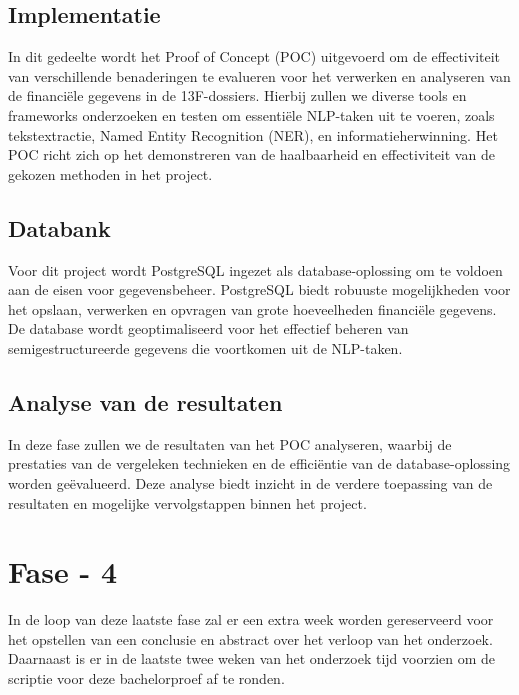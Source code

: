 \subsection{Implementatie}
In dit gedeelte wordt het Proof of Concept (POC) uitgevoerd om de effectiviteit van verschillende benaderingen te evalueren voor het verwerken en analyseren van de financiële gegevens in de 13F-dossiers. Hierbij zullen we diverse tools en frameworks onderzoeken en testen om essentiële NLP-taken uit te voeren, zoals tekstextractie, Named Entity Recognition (NER), en informatieherwinning. Het POC richt zich op het demonstreren van de haalbaarheid en effectiviteit van de gekozen methoden in het project.

\subsection{Databank}
Voor dit project wordt PostgreSQL ingezet als database-oplossing om te voldoen aan de eisen voor gegevensbeheer. PostgreSQL biedt robuuste mogelijkheden voor het opslaan, verwerken en opvragen van grote hoeveelheden financiële gegevens. De database wordt geoptimaliseerd voor het effectief beheren van semigestructureerde gegevens die voortkomen uit de NLP-taken.


\subsection{Analyse van de resultaten}
In deze fase zullen we de resultaten van het POC analyseren, waarbij de prestaties van de vergeleken technieken en de efficiëntie van de database-oplossing worden geëvalueerd. Deze analyse biedt inzicht in de verdere toepassing van de resultaten en mogelijke vervolgstappen binnen het project. %

\section{Fase - 4}
In de loop van deze laatste fase zal er een extra week worden gereserveerd voor het opstellen van een conclusie en abstract over het verloop van het onderzoek. Daarnaast is er in de laatste twee weken van het onderzoek tijd voorzien om de scriptie voor deze bachelorproef af te ronden.